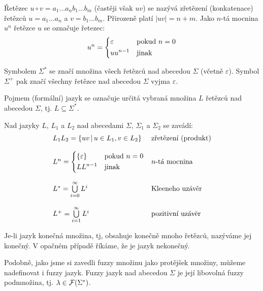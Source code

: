 \documentclass[a4paper,10pt]{article}
\begin{document}
Řetězec $u \circ v = a_1 \dots a_n b_1 \dots b_m$ (častěji však $uv$) se nazývá zřetězení (konkatenace) řetězců $u = a_1 \dots a_n$ a $v = b_1 \dots b_m$. Přirozeně platí $|uv| = n + m$. Jako $n$-tá mocnina $u^n$ řetězce $u$ se označuje řetezec:
$$
  u^n = \begin{dcases}
    \varepsilon & \text{pokud } n = 0\\
    u u^{n-1} & \text{jinak}
  \end{dcases}
$$

Symbolem $\Sigma^*$ se značí množina všech řetězců nad abecedou $\Sigma$ (včetně $\varepsilon$). Symbol $\Sigma^+$ pak značí všechny řetězce nad abecedou $\Sigma$ vyjma $\varepsilon$. %


Pojmem (formální) jazyk se označuje určitá vybraná množina $L$ řetězců nad abecedou $\Sigma$, tj. $L \subseteq \Sigma^*$.

Nad jazyky $L$, $L_1$ a $L_2$ nad abecedami $\Sigma$, $\Sigma_1$ a $\Sigma_2$ se zavádí:
$$
\begin{array}{ll}
  L_1 L_2 		= \left\{ u v \,|\, u \in L_1, v \in L_2 \right\}	& \text{zřetězení (produkt)}	\\ \\
  L^n 			= \begin{dcases}
      \left\{ \varepsilon \right\} 	& \text{pokud } n = 0 \\
      L L^{n-1} 			& \text{jinak}
    \end{dcases} 								& \text{$n$-tá mocnina}		\\ \\
  
  L^* 	= \bigcup\limits_{i=0}^{\infty} L^i						& \text{Kleeneho uzávěr}	\\ \\
  L^+ 	= \bigcup\limits_{i=1}^{\infty} L^i						& \text{pozitivní uzávěr}
\end{array}
$$

Je-li jazyk konečná množina, tj, obsahuje konečně mnoho řetězců, nazýváme jej konečný. V opačném případě říkáme, že je jazyk nekonečný.

Podobně, jako jsme si zavedli fuzzy množinu jako protějšek  množiny, můžeme nadefinovat i fuzzy jazyk. Fuzzy jazyk nad abecedou $\Sigma$ je její libovolná fuzzy podmnožina, tj. $\lambda \in \mathcal{F}(\Sigma^*)$. 
\end{document}
